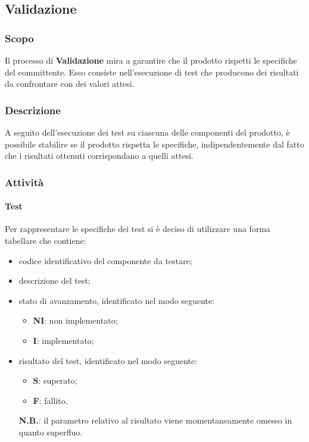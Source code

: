 		\subsection{Validazione}
		\subsubsection{Scopo}
		Il processo di \textbf{Validazione} mira a garantire che il prodotto rispetti le specifiche del committente. Esso consiste nell'esecuzione di test che producono dei risultati da confrontare con dei valori attesi.
		
		\subsubsection{Descrizione}
		A seguito dell'esecuzione dei test su ciascuna delle componenti del prodotto, è possibile stabilire se il prodotto rispetta le specifiche, indipendentemente dal fatto che i risultati ottenuti corrispondano a quelli attesi.
	
		\subsubsection{Attività}
		\paragraph{Test}
		Per rappresentare le specifiche dei test si è deciso di utilizzare una forma tabellare che contiene:
				\begin{itemize}
					\item codice identificativo del componente da testare;
					\item descrizione del test;
					\item stato di avanzamento, identificato nel modo seguente:
						\begin{itemize}
							\item \textbf{NI}: non implementato;
							\item \textbf{I}: implementato;
						\end{itemize}
					\item risultato del test, identificato nel modo seguente:
						\begin{itemize}
							\item \textbf{S}: superato;
							\item \textbf{F}: fallito.
						\end{itemize}
						\textbf{N.B.}: il parametro relativo al risultato viene momentaneamente omesso in quanto superfluo.						 
				\end{itemize}		
		
